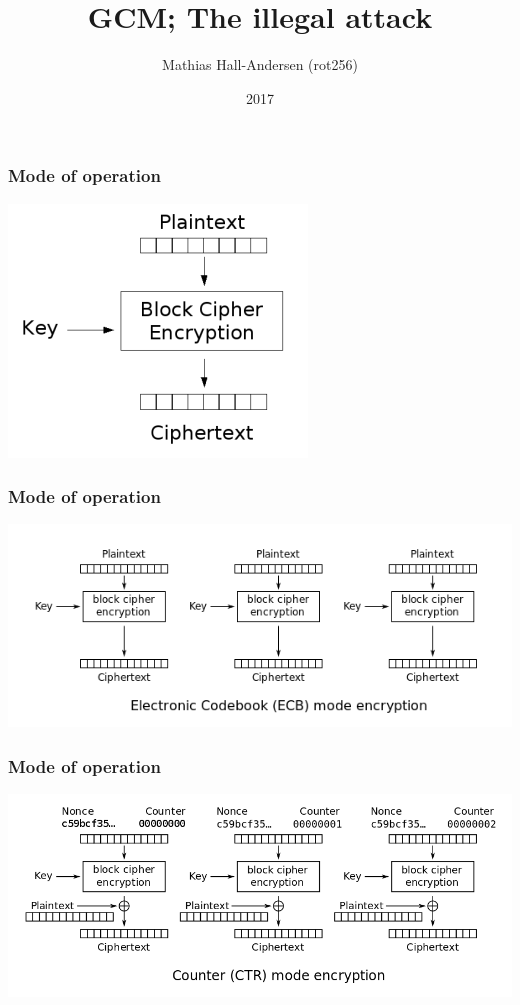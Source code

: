 \documentclass{beamer}
\title{GCM; The illegal attack}
\author{Mathias Hall-Andersen (rot256)}
\institute{Pwnies @ Copenhagen University}
\date{2017}
\begin{document}
\frame{\titlepage}

\begin{frame}
\frametitle{Mode of operation}
\begin{center}
\includegraphics[height=0.5\textheight]{block_cipher.png}
\end{center}
\end{frame}

\begin{frame}
\frametitle{Mode of operation}
\begin{center}
\includegraphics[width=\textwidth]{mode-ecb.png}
\end{center}
\end{frame}

\begin{frame}
\frametitle{Mode of operation}
\begin{center}
\includegraphics[width=\textwidth]{mode-ctr.png}
\end{center}
\end{frame}
\end{document}
